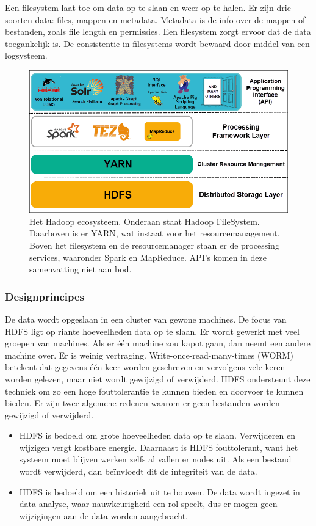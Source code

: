 \documentclass[a4paper,10pt,twoside]{report}
\begin{document}
Een filesystem laat toe om data op te slaan en weer op te halen. Er zijn drie soorten data: files, mappen en metadata. Metadata is de info over de mappen of bestanden, zoals file length en permissies. Een filesystem zorgt ervoor dat de data toegankelijk is. De consistentie in filesystems wordt bewaard door middel van een logsysteem. 

\begin{figure}
	\includegraphics[width=\linewidth]{images/hadoop-ecosystem-layers.png}
	\caption{Het Hadoop ecosysteem. Onderaan staat Hadoop FileSystem. Daarboven is er YARN, wat instaat voor het resourcemanagement. Boven het filesystem en de resourcemanager staan er de processing services, waaronder Spark en MapReduce. API's komen in deze samenvatting niet aan bod.}
\end{figure}

\subsubsection{Designprincipes}

De data wordt opgeslaan in een cluster van gewone machines. De focus van HDFS ligt op riante hoeveelheden data op te slaan. Er wordt gewerkt met veel groepen van machines. Als er één machine zou kapot gaan, dan neemt een andere machine over. Er is weinig vertraging. Write-once-read-many-times (WORM) betekent dat gegevens één keer worden geschreven en vervolgens vele keren worden gelezen, maar niet wordt gewijzigd of verwijderd. HDFS ondersteunt deze techniek om zo een hoge fouttolerantie te kunnen bieden en doorvoer te kunnen bieden. Er zijn twee algemene redenen waarom er geen bestanden worden gewijzigd of verwijderd.

\begin{itemize}
	\item HDFS is bedoeld om grote hoeveelheden data op te slaan. Verwijderen en wijzigen vergt kostbare energie. Daarnaast is HDFS fouttolerant, want het systeem moet blijven werken zelfs al vallen er nodes uit. Als een bestand wordt verwijderd, dan beïnvloedt dit de integriteit van de data.
	\item HDFS is bedoeld om een historiek uit te bouwen. De data wordt ingezet in data-analyse, waar nauwkeurigheid een rol speelt, dus er mogen geen wijzigingen aan de data worden aangebracht.
\end{itemize}
\end{document}
